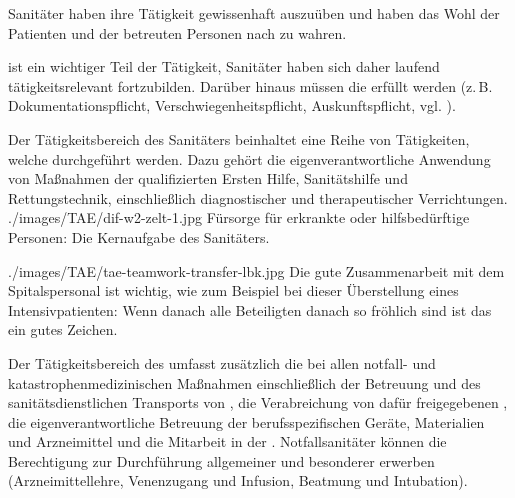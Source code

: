 Sanitäter haben ihre Tätigkeit 
gewissenhaft auszuüben und haben das Wohl der Patienten und
der betreuten Personen nach
zu wahren.

 ist ein wichtiger Teil der Tätigkeit,
Sanitäter haben sich daher laufend tätigkeitsrelevant
fortzubilden.
Darüber hinaus müssen die  erfüllt werden
(z.\,B. Dokumentationspflicht, Verschwiegenheitspflicht,
Auskunftspflicht, vgl.
).


{Der
Tätigkeitsbereich des Sanitäters beinhaltet eine Reihe von
Tätigkeiten, welche  durchgeführt
werden. Dazu gehört die eigenverantwortliche Anwendung von
Maßnahmen der qualifizierten Ersten Hilfe, Sanitätshilfe und
Rettungstechnik, einschließlich diagnostischer und
therapeutischer Verrichtungen. } {}
{./images/TAE/dif-w2-zelt-1.jpg} {Fürsorge für erkrankte oder
hilfsbedürftige Personen: Die Kernaufgabe des
Sanitäters.} {}


 {}
{./images/TAE/tae-teamwork-transfer-lbk.jpg} {Die gute
Zusammenarbeit mit dem Spitalspersonal ist wichtig, wie zum
Beispiel bei dieser Überstellung eines Intensivpatienten:
Wenn danach alle Beteiligten danach so fröhlich sind ist das
ein gutes Zeichen.}
{}



{Der
Tätigkeitsbereich des  umfasst
zusätzlich die  bei allen
notfall- und katastrophenmedizinischen Maßnahmen
einschließlich der Betreuung und des sanitätsdienstlichen
Transports von , die Verabreichung von
dafür freigegebenen , die
eigenverantwortliche Betreuung der berufsspezifischen Geräte,
Materialien und Arzneimittel und die Mitarbeit in der
. Notfallsanitäter können die Berechtigung zur
Durchführung allgemeiner und besonderer
 erwerben (Arzneimittellehre,
Venenzugang und Infusion, Beatmung und Intubation). }{}{}{}{}


